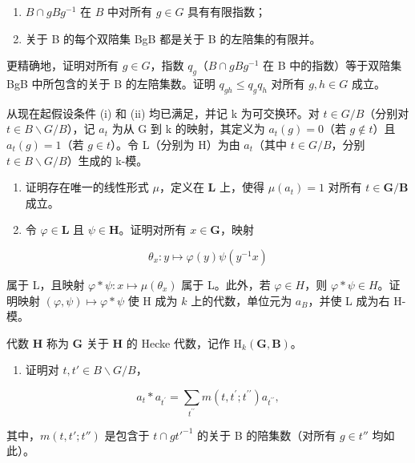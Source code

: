 \begin{enumerate}
\def\labelenumi{(\roman{enumi})}
\item
  \(B \cap gBg^{-1}\) 在 \(B\) 中对所有 \(g \in G\) 具有有限指数；
\item
  关于 B 的每个双陪集 BgB 都是关于 B 的左陪集的有限并。
\end{enumerate}

更精确地，证明对所有 \(g \in G\)，指数 \(q_{g}\)（\(B \cap gBg^{-1}\) 在 B 中的指数）等于双陪集 BgB 中所包含的关于 B 的左陪集数。证明 \(q_{gh} \leqslant q_{g}q_{h}\) 对所有 \(g, h \in G\) 成立。

从现在起假设条件 (i) 和 (ii) 均已满足，并记 k 为可交换环。对 \(t \in G/B\)（分别对 \(t \in B \backslash G/B\)），记 \(a_{t}\) 为从 G 到 k 的映射，其定义为 \(a_{t}(g) = 0\)（若 \(g \notin t\)）且 \(a_{t}(g) = 1\)（若 \(g \in t\)）。令 L（分别为 H）为由 \(a_{t}\)（其中 \(t \in G/B\)，分别 \(t \in B \backslash G/B\)）生成的 k-模。

\begin{enumerate}
\def\labelenumi{\alph{enumi})}
\setcounter{enumi}{1}
\item
  证明存在唯一的线性形式 \(\mu\)，定义在 \(\mathbf{L}\) 上，使得 \(\mu(a_t) = 1\) 对所有 \(t \in \mathbf{G} / \mathbf{B}\) 成立。
\item
  令 \(\varphi \in \mathbf{L}\) 且 \(\psi \in \mathbf{H}\)。证明对所有 \(x \in \mathbf{G}\)，映射
\end{enumerate}

\[
\theta_ {x}: y \mapsto \varphi (y) \psi (y ^ {- 1} x)
\]

属于 L，且映射 \(\varphi * \psi : x \mapsto \mu(\theta_x)\) 属于 L。此外，若 \(\varphi \in H\)，则 \(\varphi * \psi \in H\)。证明映射 \((\varphi, \psi) \mapsto \varphi * \psi\) 使 H 成为 \(k\) 上的代数，单位元为 \(a_B\)，并使 L 成为右 H-模。

代数 \(\mathbf{H}\) 称为 \(\mathbf{G}\) 关于 \(\mathbf{H}\) 的 Hecke 代数，记作 \(\mathrm{H}_k(\mathbf{G},\mathbf{B})\)。

\begin{enumerate}
\def\labelenumi{\alph{enumi})}
\setcounter{enumi}{3}
\tightlist
\item
  证明对 \(t, t' \in B \backslash G / B\)，
\end{enumerate}

\[
a _ {t} * a _ {t ^ {\prime}} = \sum_ {t ^ {\prime \prime}} m (t, t ^ {\prime}; t ^ {\prime \prime}) a _ {t ^ {\prime \prime}},
\]

其中，\(m(t, t'; t'')\) 是包含于 \(t \cap gt'^{-1}\) 的关于 B 的陪集数（对所有 \(g \in t''\) 均如此）。

